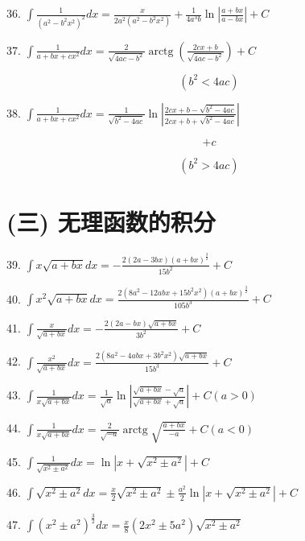 \documentclass[10pt]{article}
\begin{document}
36. \(\int \frac{1}{{\left( {a}^{2} - {b}^{2}{x}^{2}\right) }^{2}}{dx} = \frac{x}{2{a}^{2}\left( {{a}^{2} - {b}^{2}{x}^{2}}\right) } + \frac{1}{4{a}^{3}b}\ln \left| \frac{a + {bx}}{a - {bx}}\right| + C\)

37. \(\int \frac{1}{a + {bx} + c{x}^{2}}{dx} = \frac{2}{\sqrt{{4ac} - {b}^{2}}}\operatorname{arctg}\left( \frac{{2cx} + b}{\sqrt{{4ac} - {b}^{2}}}\right) + C\)

\[
\left( {{b}^{2} < {4ac}}\right)
\]

38. \(\int \frac{1}{a + {bx} + c{x}^{2}}{dx} = \frac{1}{\sqrt{{b}^{2} - {4ac}}}\ln \left| \frac{{2cx} + b - \sqrt{{b}^{2} - {4ac}}}{{2cx} + b + \sqrt{{b}^{2} - {4ac}}}\right|\)

\[
+ c
\]

\[
\left( {{b}^{2} > {4ac}}\right)
\]

\section*{(三) 无理函数的积分}

39. \(\int x\sqrt{a + {bx}}{dx} = - \frac{2\left( {{2a} - {3bx}}\right) {\left( a + bx\right) }^{\frac{3}{2}}}{{15}{b}^{2}} + C\)

40. \(\int {x}^{2}\sqrt{a + {bx}}{dx} = \frac{2\left( {8{a}^{2} - {12abx} + {15}{b}^{2}{x}^{2}}\right) {\left( a + bx\right) }^{\frac{3}{2}}}{{105}{b}^{3}} + C\)

41. \(\int \frac{x}{\sqrt{a + {bx}}}{dx} = - \frac{2\left( {{2a} - {bx}}\right) \sqrt{a + {bx}}}{3{b}^{2}} + C\)

42. \(\int \frac{{x}^{2}}{\sqrt{a + {bx}}}{dx} = \frac{2\left( {8{a}^{2} - {4abx} + 3{b}^{2}{x}^{2}}\right) \sqrt{a + {bx}}}{{15}{b}^{3}} + C\)

43. \(\int \frac{1}{x\sqrt{a + {bx}}}{dx} = \frac{1}{\sqrt{a}}\ln \left| \frac{\sqrt{a + {bx}} - \sqrt{a}}{\sqrt{a + {bx}} + \sqrt{a}}\right| + C\left( {a > 0}\right)\)

44. \(\int \frac{1}{x\sqrt{a + {bx}}}{dx} = \frac{2}{\sqrt{-a}}\operatorname{arctg}\sqrt{\frac{a + {bx}}{-a}} + C\left( {a < 0}\right)\)

45. \(\int \frac{1}{\sqrt{{x}^{2} \pm {a}^{2}}}{dx} = \ln \left| {x + \sqrt{{x}^{2} \pm {a}^{2}}}\right| + C\)

46. \(\int \sqrt{{x}^{2} \pm {a}^{2}}{dx} = \frac{x}{2}\sqrt{{x}^{2} \pm {a}^{2}} \pm \frac{{a}^{2}}{2}\ln \left| {x + \sqrt{{x}^{2} \pm {a}^{2}}}\right| + C\)

47. \(\int {\left( {x}^{2} \pm {a}^{2}\right) }^{\frac{3}{2}}{dx} = \frac{x}{8}\left( {2{x}^{2} \pm 5{a}^{2}}\right) \sqrt{{x}^{2} \pm {a}^{2}}\)
\end{document}
